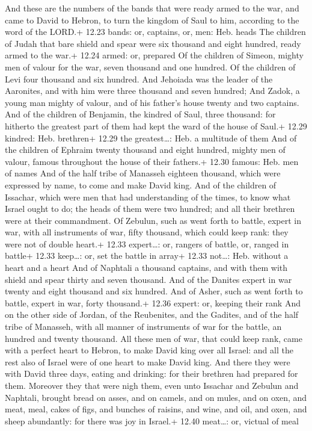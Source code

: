  And these are the numbers of the bands that were ready
armed to the war, and came to David to Hebron, to turn the kingdom of
Saul to him, according to the word of the LORD.+ 12.23 bands: or,
captains, or, men: Heb. heads  The children of Judah that
bare shield and spear were six thousand and eight hundred, ready armed
to the war.+ 12.24 armed: or, prepared  Of the children of
Simeon, mighty men of valour for the war, seven thousand and one
hundred.  Of the children of Levi four thousand and six
hundred.  And Jehoiada was the leader of the Aaronites, and
with him were three thousand and seven hundred;  And Zadok,
a young man mighty of valour, and of his father's house twenty and two
captains.  And of the children of Benjamin, the kindred of
Saul, three thousand: for hitherto the greatest part of them had kept
the ward of the house of Saul.+ 12.29 kindred: Heb. brethren+ 12.29 the
greatest\ldots: Heb. a multitude of them  And of the
children of Ephraim twenty thousand and eight hundred, mighty men of
valour, famous throughout the house of their fathers.+ 12.30 famous:
Heb. men of names  And of the half tribe of Manasseh
eighteen thousand, which were expressed by name, to come and make David
king.  And of the children of Issachar, which were men that
had understanding of the times, to know what Israel ought to do; the
heads of them were two hundred; and all their brethren were at their
commandment.  Of Zebulun, such as went forth to battle,
expert in war, with all instruments of war, fifty thousand, which could
keep rank: they were not of double heart.+ 12.33 expert\ldots: or,
rangers of battle, or, ranged in battle+ 12.33 keep\ldots: or, set the
battle in array+ 12.33 not\ldots: Heb. without a heart and a heart
 And of Naphtali a thousand captains, and with them with
shield and spear thirty and seven thousand.  And of the
Danites expert in war twenty and eight thousand and six hundred.
 And of Asher, such as went forth to battle, expert in war,
forty thousand.+ 12.36 expert: or, keeping their rank  And
on the other side of Jordan, of the Reubenites, and the Gadites, and of
the half tribe of Manasseh, with all manner of instruments of war for
the battle, an hundred and twenty thousand.  All these men
of war, that could keep rank, came with a perfect heart to Hebron, to
make David king over all Israel: and all the rest also of Israel were of
one heart to make David king.  And there they were with
David three days, eating and drinking: for their brethren had prepared
for them.  Moreover they that were nigh them, even unto
Issachar and Zebulun and Naphtali, brought bread on asses, and on
camels, and on mules, and on oxen, and meat, meal, cakes of figs, and
bunches of raisins, and wine, and oil, and oxen, and sheep abundantly:
for there was joy in Israel.+ 12.40 meat\ldots: or, victual of meal

